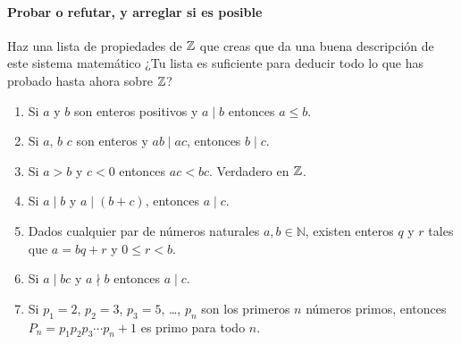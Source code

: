 \paragraph{Probar o refutar, y arreglar si es posible}
Haz una lista de propiedades de $\mathbb{Z}$ que creas que da
una buena descripci\'on de este sistema matemático
¿Tu lista es suficiente para deducir todo lo que has probado hasta
ahora sobre $\mathbb{Z}$?
\begin{enumerate}[label=P\arabic*]
	\conti
	\item\label{item:division:orden}
		Si $a$ y $b$ son enteros positivos y $a \mid b$ entonces $a \leq b$.
	\item\label{item:division:cancelacion}
		Si $a$, $b$  $c$ son enteros y $ab \mid ac$, entonces $b \mid c$.
	\item\label{item:multiplicacion:negativo}
		Si $a > b$ y $c < 0$ entonces $ac < bc$.
		Verdadero en $\mathbb{Z}$.
	\item\label{item:division:suma}
		Si $a \mid b$ y $a \mid (b + c)$, entonces $a \mid c$.
	\item\label{item:division:algoritmo}
		Dados cualquier par de n\'umeros naturales $a, b \in \mathbb{N}$,
		existen enteros $q$ y $r$ tales que $a = bq + r$ y $0 \leq r < b$.
	\item\label{item:division:alternativa}
		Si $a \mid bc$ y $a \nmid b$ entonces $a \mid c$.
	\item\label{item:primos:sucesion}
		Si $p_1 = 2$, $p_2 = 3$, $p_3 = 5$, \ldots, $p_n$ son los primeros $n$
		n\'umeros primos, entonces $P_n = p_1 p_2 p_3 \cdots p_n + 1$
		es primo para todo $n$.
	\seti
\end{enumerate}
%


